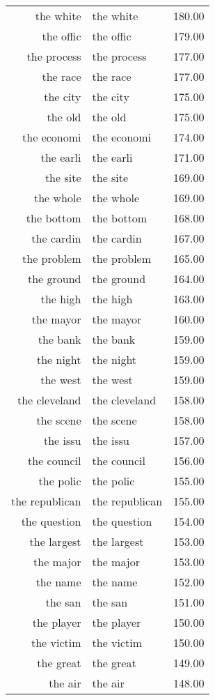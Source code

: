 \begin{table}[ht]
\begin{tabular}{rlr}
  the white & the white & 180.00 \\ 
  the offic & the offic & 179.00 \\ 
  the process & the process & 177.00 \\ 
  the race & the race & 177.00 \\ 
  the city & the city & 175.00 \\ 
  the old & the old & 175.00 \\ 
  the economi & the economi & 174.00 \\ 
  the earli & the earli & 171.00 \\ 
  the site & the site & 169.00 \\ 
  the whole & the whole & 169.00 \\ 
  the bottom & the bottom & 168.00 \\ 
  the cardin & the cardin & 167.00 \\ 
  the problem & the problem & 165.00 \\ 
  the ground & the ground & 164.00 \\ 
  the high & the high & 163.00 \\ 
  the mayor & the mayor & 160.00 \\ 
  the bank & the bank & 159.00 \\ 
  the night & the night & 159.00 \\ 
  the west & the west & 159.00 \\ 
  the cleveland & the cleveland & 158.00 \\ 
  the scene & the scene & 158.00 \\ 
  the issu & the issu & 157.00 \\ 
  the council & the council & 156.00 \\ 
  the polic & the polic & 155.00 \\ 
  the republican & the republican & 155.00 \\ 
  the question & the question & 154.00 \\ 
  the largest & the largest & 153.00 \\ 
  the major & the major & 153.00 \\ 
  the name & the name & 152.00 \\ 
  the san & the san & 151.00 \\ 
  the player & the player & 150.00 \\ 
  the victim & the victim & 150.00 \\ 
  the great & the great & 149.00 \\ 
  the air & the air & 148.00 \\ 

\end{tabular}
\end{table}

